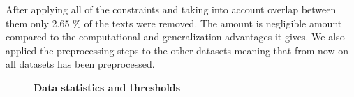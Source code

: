 After applying all of the constraints and taking into account overlap between
them only 2.65 \% of the texts were removed. The amount is negligible amount
compared to the computational and generalization advantages it gives. We also
applied the preprocessing steps to the other datasets meaning that from now on
all datasets has been preprocessed.

\begin{figure}[htb]
    \centering
    \textbf{Data statistics and thresholds}\\
    \begin{minipage}{.5\linewidth}
        \centering
    \end{minipage}%
    \begin{minipage}{.5\linewidth}
        \centering
\end{minipage}
\end{figure}
